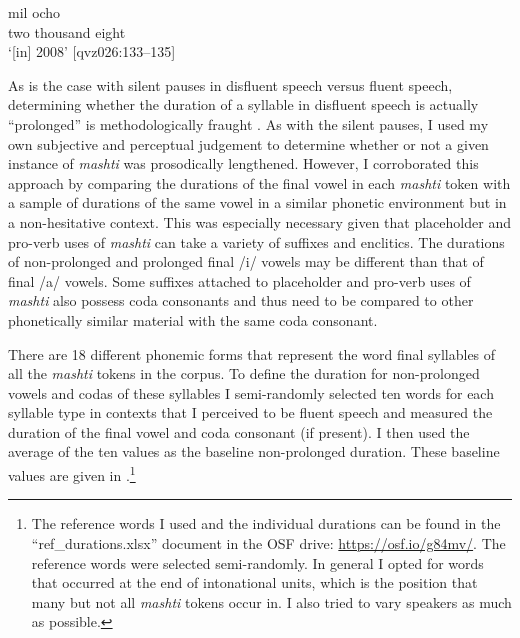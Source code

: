 \documentclass[output=paper]{langscibook}
\begin{document}
\ex \label{ex:rice:25c}
 {mil} {ocho}\\
{two} {thousand} {eight}\\
 \glt  ‘[in] 2008’ [qvz026:133--135]
\z\z

As is the case with silent pauses in disfluent speech versus fluent speech, determining whether the duration of a syllable in disfluent speech is actually “prolonged” is methodologically fraught \citep[458]{Lickley2015}.  As with the silent pauses, I used my own subjective and perceptual judgement to determine whether or not a given instance of \textit{mashti} was prosodically lengthened. However, I corroborated this approach by comparing the durations of the final vowel in each \textit{mashti} token with a sample of durations of the same vowel in a similar phonetic environment but in a non-hesitative context. This was especially necessary given that placeholder and pro-verb uses of \textit{mashti} can take a variety of suffixes and enclitics. The durations of non-prolonged and prolonged final /i/ vowels may be different than that of final /a/ vowels. Some suffixes attached to placeholder and pro-verb uses of \textit{mashti} also possess coda consonants and thus need to be compared to other phonetically similar material with the same coda consonant.

There are 18 different phonemic forms that represent the word final syllables of all the \textit{mashti} tokens in the corpus. To define the duration for non-prolonged vowels and codas of these syllables I semi-randomly selected ten words for each syllable type in contexts that I perceived to be fluent speech and measured the duration of the final vowel and coda consonant (if present). I then used the average of the ten values as the baseline non-prolonged duration. These baseline values are given in .\footnote{The reference words I used and the individual durations can be found in the “ref\_durations.xlsx” document in the OSF drive: \url{https://osf.io/g84mv/}. The reference words were selected semi-randomly. In general I opted for words that occurred at the end of intonational units, which is the position that many but not all \textit{mashti} tokens occur in. I also tried to vary speakers as much as possible.}
\end{document}
